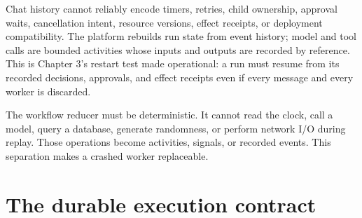 
Chat history cannot reliably encode timers, retries, child ownership, approval waits, cancellation intent, resource versions, effect receipts, or deployment compatibility. The platform rebuilds run state from event history; model and tool calls are bounded activities whose inputs and outputs are recorded by reference. This is Chapter 3's restart test made operational: a run must resume from its recorded decisions, approvals, and effect receipts even if every message and every worker is discarded.\par

The workflow reducer must be deterministic. It cannot read the clock, call a model, query a database, generate randomness, or perform network I/O during replay. Those operations become activities, signals, or recorded events. This separation makes a crashed worker replaceable.\par

\section{The durable execution contract}

